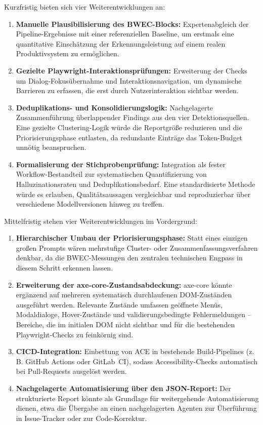 Kurzfristig bieten sich vier Weiterentwicklungen an:
\begin{enumerate}
    \item \textbf{Manuelle Plausibilisierung des \ac{BWEC}-Blocks:} Expertenabgleich der Pipeline-Ergebnisse mit einer referenziellen Baseline, um erstmals eine quantitative Einschätzung der Erkennungsleistung auf einem realen Produktivsystem zu ermöglichen.
    \item \textbf{Gezielte Playwright-Interaktionsprüfungen:} Erweiterung der Checks um Dialog-Fokusübernahme und Interaktionsnavigation, um dynamische Barrieren zu erfassen, die erst durch Nutzerinteraktion sichtbar werden.
    \item \textbf{Deduplikations- und Konsolidierungslogik:} Nachgelagerte Zusammenführung überlappender Findings aus den vier Detektionsquellen. Eine gezielte Clustering-Logik würde die Reportgröße reduzieren und die Priorisierungsphase entlasten, da redundante Einträge das Token-Budget unnötig beanspruchen.
    \item \textbf{Formalisierung der Stichprobenprüfung:} Integration als fester Workflow-Bestandteil zur systematischen Quantifizierung von Halluzinationsraten und Deduplikationsbedarf. \mbox{Eine} standardisierte Methode würde es erlauben, Qualitätsaussagen vergleichbar und reproduzierbar über verschiedene Modellversionen hinweg zu treffen.
\end{enumerate}

Mittelfristig stehen vier Weiterentwicklungen im Vordergrund:
\begin{enumerate}
    \item \textbf{Hierarchischer Umbau der Priorisierungsphase:} Statt eines einzigen großen Prompts wären mehrstufige Cluster- oder Zusammenfassungsverfahren denkbar, da die \ac{BWEC}-Messungen den zentralen technischen Engpass in diesem Schritt erkennen lassen.
    \item \textbf{Erweiterung der axe-core-Zustandsabdeckung:} axe-core könnte ergänzend auf mehreren systematisch durchlaufenen \ac{DOM}-Zuständen ausgeführt werden. Relevante Zustände umfassen geöffnete Menüs, Modaldialoge, Hover-Zustände und validierungsbedingte Fehler\-meldungen -- Bereiche, die im initialen \ac{DOM} nicht sichtbar und für die bestehenden Playwright-Checks zu feinkörnig sind.
    \item \textbf{\acs{CICD}-Integration:} Einbettung von \ac{ACE} in bestehende Build-Pipelines (z.\,B. GitHub Actions oder GitLab~\acs{CI}), sodass Accessibility-Checks automatisch bei Pull-Requests ausgelöst werden.
    \item \textbf{Nachgelagerte Automatisierung über den \acs{JSON}-Report:} Der strukturierte Report könnte als Grundlage für weitergehende Automatisierung dienen, etwa die Übergabe an einen nachgelagerten Agenten zur Überführung in Issue-Tracker oder zur Code-Korrektur.
\end{enumerate}

